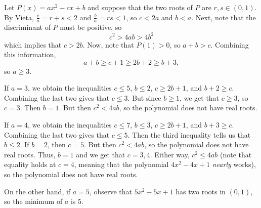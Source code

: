 Let $P\left(x\right)=ax^2-cx+b$ and suppose that the two roots of $P$ are $r,s\in\left(0,1\right)$. By Vieta, $\frac{c}{a}=r+s<2$ and $\frac{b}{a}=rs<1$, so $c<2a$ and $b<a$. Next, note that the discriminant of $P$ must be positive, so \[c^2>4ab>4b^2\] which implies that $c>2b$. Now, note that $P\left(1\right)>0$, so $a+b>c$. Combining this information, \[a+b\geq c+1\geq 2b+2\geq b+3,\] so $a\geq3$.

If $a=3$, we obtain the inequalities $c\leq5$, $b\leq2$, $c\geq2b+1$, and $b+2\geq c$. Combining the last two gives that $c\leq3$. But since $b\geq1$, we get that $c\geq3$, so $c=3$. Then $b=1$. But then $c^2<4ab$, so the polynomial does not have real roots.

If $a=4$, we obtain the inequalities $c\leq7$, $b\leq3$, $c\geq2b+1$, and $b+3\geq c$. Combining the last two gives that $c\leq5$. Then the third inequality tells us that $b\leq2$. If $b=2$, then $c=5$. But then $c^2<4ab$, so the polynomial does not have real roots. Thus, $b=1$ and we get that $c=3,4$. Either way, $c^2\leq4ab$ (note that equality holds at $c=4$, meaning that the polynomial $4x^2-4x+1$ \emph{nearly} works), so the polynomial does not have real roots.

On the other hand, if $a=5$, observe that $5x^2-5x+1$ has two roots in $\left(0,1\right)$, so the minimum of $a$ is $\boxed{5}$.